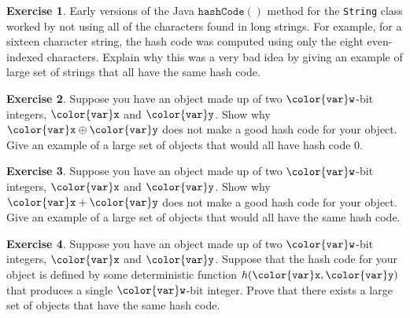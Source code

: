 \documentclass[10pt]{book}
\theoremstyle{plain}
\theoremstyle{definition}
\newtheorem{exc}{Exercise}[chapter]
\newcommand{\exclabel}[1]{\label{exc:#1}}
\begin{document}
\begin{exc}
  Early versions of the Java \ensuremath{\mathtt{hashCode()}} method for the \texttt{String} class
  worked by not using all of the characters found in long strings. For
  example, for a sixteen character string, the hash code was computed
  using only the eight even-indexed characters. Explain why this was a
  very bad idea by giving an example of large set of strings that all
  have the same hash code.
\end{exc}

\begin{exc}\exclabel{hash-hack-first}
  Suppose you have an object made up of two \ensuremath{\mathtt{{\color{var}w}}}-bit integers, \ensuremath{\mathtt{{\color{var}x}}} and \ensuremath{\mathtt{{\color{var}y}}}.
  Show why $\ensuremath{\mathtt{{\color{var}x}}}\oplus\ensuremath{\mathtt{{\color{var}y}}}$ does not make a good hash code for your object.
  Give an example of a large set of objects that would all have hash
  code 0.
\end{exc}

\begin{exc}
  Suppose you have an object made up of two \ensuremath{\mathtt{{\color{var}w}}}-bit integers, \ensuremath{\mathtt{{\color{var}x}}} and \ensuremath{\mathtt{{\color{var}y}}}.
  Show why $\ensuremath{\mathtt{{\color{var}x}}}+\ensuremath{\mathtt{{\color{var}y}}}$ does not make a good hash code for your object.
  Give an example of a large set of objects that would all have the same
  hash code.
\end{exc}

\begin{exc}\exclabel{hash-hack-last}
  Suppose you have an object made up of two \ensuremath{\mathtt{{\color{var}w}}}-bit integers, \ensuremath{\mathtt{{\color{var}x}}}
  and \ensuremath{\mathtt{{\color{var}y}}}.  Suppose that the hash code for your object is defined
  by some deterministic function $h(\ensuremath{\mathtt{{\color{var}x}}},\ensuremath{\mathtt{{\color{var}y}}})$ that produces a single
  \ensuremath{\mathtt{{\color{var}w}}}-bit integer.  Prove that there exists a large set of objects that
  have the same hash code.
\end{exc}
\end{document}
